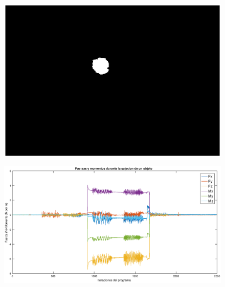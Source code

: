 \begin{figure}
	\centering
	\includegraphics[width=1\linewidth]{visio/graficasderesultados/temp1}
	\caption{}
	\label{fig:temp1}
\end{figure}
\begin{figure}
	\centering
	\includegraphics[width=1\linewidth]{visio/graficasderesultados/twist1}
	\caption{}
	\label{fig:twist1}
\end{figure}


